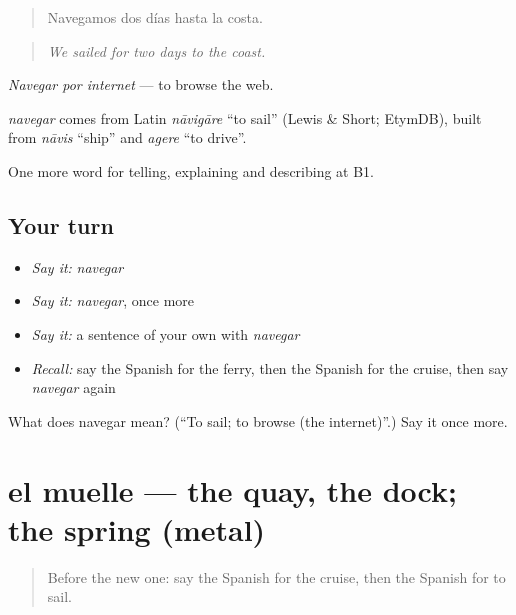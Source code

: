 \begin{quote}
Navegamos dos días hasta la costa.
\end{quote}

\begin{quote}
\emph{We sailed for two days to the coast.}
\end{quote}

\emph{Navegar por internet} — to browse the web.

\begin{cousinweb}
\emph{navegar} comes from Latin \emph{nāvigāre} \textquotedblleft{}to sail\textquotedblright{} (Lewis \& Short; EtymDB), built from \emph{nāvis} \textquotedblleft{}ship\textquotedblright{} and \emph{agere} \textquotedblleft{}to drive\textquotedblright{}.
\end{cousinweb}

\begin{grammarlens}[title={What you've built}]
One more word for telling, explaining and describing at B1.
\end{grammarlens}

\subsection*{Your turn}
\begin{itemize}
\raggedright
  \item \emph{Say it:} \emph{navegar}
  \item \emph{Say it:} \emph{navegar}, once more
  \item \emph{Say it:} a sentence of your own with \emph{navegar}
  \item \emph{Recall:} say the Spanish for the ferry, then the Spanish for the cruise, then say \emph{navegar} again
\end{itemize}

\begin{tcolorbox}[breakable,colback=teal!4,colframe=teal!35!black,title={Before you move on}]
What does navegar mean? (\textquotedblleft{}To sail; to browse (the internet)\textquotedblright{}.) Say it once more.
\end{tcolorbox}
\section[el muelle]{el muelle — the quay, the dock; the spring (metal)}

\label{lesson:ES-C658-muelle}



\begin{quote}
Before the new one: say the Spanish for the cruise, then the Spanish for to sail.
\end{quote}


